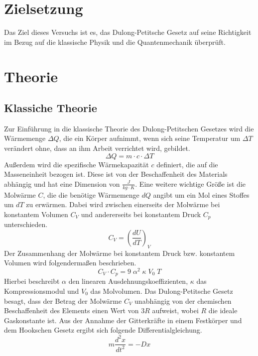 \section{Zielsetzung}
Das Ziel dieses Versuchs ist es, das Dulong-Petitsche Gesetz auf seine Richtigkeit im Bezug auf die klassische Physik und die Quantenmechanik überprüft.

\section{Theorie}
\subsection{Klassiche Theorie}
Zur Einführung in die klassische Theorie des Dulong-Petitschen Gesetzes wird die Wärmemenge $\Delta Q$, die ein Körper aufnimmt, wenn sich seine Temperatur um $\Delta T$ verändert ohne, dass an ihm Arbeit verrichtet wird, gebildet.
\begin{equation}
    \Delta Q = m \cdot c \cdot \Delta T
\end{equation}
Außerdem wird die spezifische Wärmekapazität $c$ definiert, die auf die Masseneinheit bezogen ist.
Diese ist von der Beschaffenheit des Materials abhängig und hat eine Dimension von $\frac{J}{kg \cdot K}$.
Eine weitere wichtige Größe ist die Molwärme $C$, die die benötige Wärmemenge $dQ$ angibt um ein Mol eines Stoffes um $dT$ zu erwärmen.
Dabei wird zwischen einerseits der Molwärme bei konstantem Volumen $C_V$ und andererseits bei konstantem Druck $C_p$ unterschieden.
\begin{equation}
    C_V = \left (\frac{dU}{dT} \right )_V
\end{equation}
Der Zusammenhang der Molwärme bei konstantem Druck bzw. konstantem Volumen wird folgendermaßen beschrieben.
\begin{equation}
    C_V \cdot C_p = 9\; \alpha^{2}\; \kappa \;V_0 \;T
\end{equation}
Hierbei beschreibt $\alpha$ den linearen Ausdehnungskoeffizienten, $\kappa$ das Kompressionsmodul und $V_0$ das Molvolumen.
Das Dulong-Petitsche Gesetz besagt, dass der Betrag der Molwärme $C_V$ unabhängig von der chemischen Beschaffenheit des Elements einen Wert von $3R$ aufweist, wobei $R$ die ideale Gaskonstante ist.
Aus der Annahme der Gitterkräfte in einem Festkörper und dem Hookschen Gesetz ergibt sich folgende Differentialgleichung.
\begin{equation}
    m \frac{d^{2}x}{dt^{2}} = -Dx
\end{equation}
